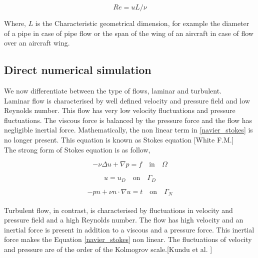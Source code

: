 \documentclass[a4paper,openany]{book}
\begin{document}
\begin{equation} \label{reynolds_number}
Re =  u L / \nu
\end{equation}

Where, $L$ is the Characteristic geometrical dimension, for example the diameter of a pipe in case of pipe flow or the span of the wing of an aircraft in case of flow over an aircraft wing.\\

\subsection[DNS]{Direct numerical simulation} 

We now differentiate between the type of flows, laminar and turbulent.\\

Laminar flow is characterised by well defined velocity and pressure field and low Reynolds number. This flow has very low velocity fluctuations and pressure fluctuations. The viscous force is balanced by the pressure force and the flow has negligible inertial force. Mathematically, the non linear term in \eqref{navier_stokes} is no longer present. This equation is known as Stokes equation [White F.M.\cite{white}]\\

The strong form of Stokes equation is as follow,

\begin{equation} \label{stokes_strong_form}
-\nu \Delta u + \nabla p = f \quad \textrm{in} \quad \Omega
\end{equation}

\begin{equation} \label{dirichlet condition stokes}
u = u_D \quad \textrm{on} \quad \Gamma_D
\end{equation}

\begin{equation} \label{neumann condition stokes}
-pn + \nu n \cdot \nabla u = t \quad \textrm{on} \quad \Gamma_N
\end{equation}
\\

Turbulent flow, in contrast, is characterised by fluctuations in velocity and pressure field and a high Reynolds number. The flow has high velocity and an inertial force is present in addition to a viscous and a pressure force. This inertial force makes the Equation \eqref{navier_stokes} non linear. The fluctuations of velocity and pressure are of the order of the Kolmogrov scale.[Kundu et al. \cite{Kundu}]\\
\end{document}
